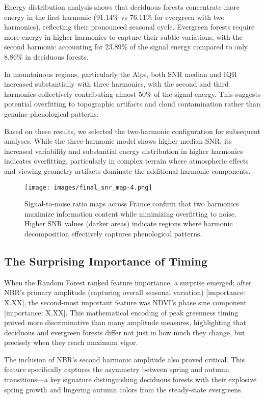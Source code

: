 \documentclass[utf8]{FrontiersinHarvard}
\begin{document}
Energy distribution analysis shows that deciduous forests concentrate more energy in the first harmonic (91.14\% vs 76.11\% for evergreen with two harmonics), reflecting their pronounced seasonal cycle. Evergreen forests require more energy in higher harmonics to capture their subtle variations, with the second harmonic accounting for 23.89\% of the signal energy compared to only 8.86\% in deciduous forests.

In mountainous regions, particularly the Alps, both SNR median and IQR increased substantially with three harmonics, with the second and third harmonics collectively contributing almost 50\% of the signal energy. This suggests potential overfitting to topographic artifacts and cloud contamination rather than genuine phenological patterns.

Based on these results, we selected the two-harmonic configuration for subsequent analyses. While the three-harmonic model shows higher median SNR, its increased variability and substantial energy distribution in higher harmonics indicates overfitting, particularly in complex terrain where atmospheric effects and viewing geometry artifacts dominate the additional harmonic components.

\begin{figure}[H]
    \centering
    \texttt{[image: images/final\_snr\_map-4.png]}
    \caption{Signal-to-noise ratio maps across France confirm that two harmonics maximize information content while minimizing overfitting to noise. Higher SNR values (darker areas) indicate regions where harmonic decomposition effectively captures phenological patterns.}
    \label{fig:snr_maps}
\end{figure}

\subsection{The Surprising Importance of Timing}

When the Random Forest ranked feature importance, a surprise emerged: after NBR's primary amplitude (capturing overall seasonal variation) [importance: X.XX], the second-most important feature was NDVI's phase sine component [importance: X.XX]. This mathematical encoding of peak greenness timing proved more discriminative than many amplitude measures, highlighting that deciduous and evergreen forests differ not just in how much they change, but precisely when they reach maximum vigor.

The inclusion of NBR's second harmonic amplitude also proved critical. This feature specifically captures the asymmetry between spring and autumn transitions—a key signature distinguishing deciduous forests with their explosive spring growth and lingering autumn colors from the steady-state evergreens.
\end{document}
